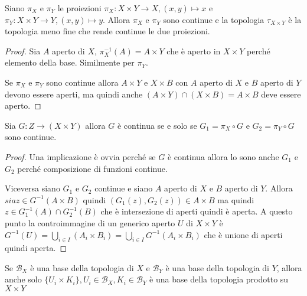 \begin{theorem}
    Siano \(\pi_X\) e \(\pi_Y\) le proiezioni \(\pi_X : X \times Y \to X, (x, y)
    \mapsto x\) e \(\pi_Y : X \times Y \to Y, (x, y) \mapsto y\). Allora
    \(\pi_X\) e \(\pi_Y\) sono continue e la topologia \(\tau_{X \times Y}\) è
    la topologia meno fine che rende continue le due proiezioni.
\end{theorem}
\begin{proof}
    Sia \(A\) aperto di \(X\), \(\pi_X^{-1}(A) = A \times Y\) che è aperto in
    \(X \times Y\) perché elemento della base.
    Similmente per \(\pi_Y\).

    Se \(\pi_X\) e \(\pi_Y\) sono continue allora \(A \times Y\) e \(X \times
    B\) con \(A\) aperto di \(X\)  e \(B\) aperto di \(Y\) devono essere aperti,
    ma quindi anche \((A\times Y) \cap (X \times B) = A \times B\) deve essere
    aperto.
\end{proof}

\begin{proposition}
    Sia \(G : Z \to (X \times Y)\) allora \(G\) è continua se e solo se \(G_{1}
    = \pi_X \circ G\) e \(G_{2} = \pi_Y \circ G\) sono continue.
\end{proposition}


\begin{proof}
    Una implicazione è ovvia perché se \(G\) è continua allora lo sono anche
    \(G_{1}\) e \(G_{2}\) perché composizione di funzioni continue.

    Viceversa siano \(G_{1}\) e \(G_{2}\) continue e siano \(A\) aperto di \(X\)
    e \(B\) aperto di \(Y\). Allora \(sia z \in G^{-1}(A \times B)\) quindi
    \((G_{1}(z), G_{2}(z)) \in A \times B\) ma quindi \(z \in  G_{1}^{-1}(A)
    \cap G_{2}^{-1}(B)\) che è intersezione di aperti quindi è aperta.
    A questo punto la controimmagine di un generico aperto \(U\) di \(X \times
    Y\) è \(G^{-1}(U) = \bigcup_{i \in I} (A_{i}\times B_{i}) = \bigcup_{i \in
    I} G^{-1}(A_{i} \times B_{i})\) che è unione di aperti quindi aperta.   
\end{proof}

\begin{remark}
    Se \(\mathcal{B}_X\) è una base della topologia di \(X\) e \(\mathcal{B}_Y\)
    è una base della topologia di \(Y\), allora anche solo \(\{U_{i} \times
    K_{i}\}, U_{i} \in  \mathcal{B}_X, K_{i} \in  \mathcal{B}_Y\) è una base
    della topologia prodotto su \(X \times  Y\) 
\end{remark}


